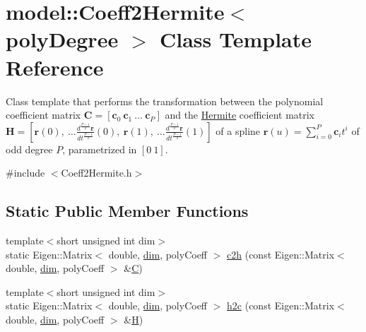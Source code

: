 \hypertarget{classmodel_1_1_coeff2_hermite}{}\section{model\+:\+:Coeff2\+Hermite$<$ poly\+Degree $>$ Class Template Reference}
\label{classmodel_1_1_coeff2_hermite}


Class template that performs the transformation between the polynomial coefficient matrix $ \mathbf{C}=\left[\mathbf{c}_0\ \mathbf{c}_1\ \ldots \ \mathbf{c}_P\right]$ and the \hyperlink{classmodel_1_1_hermite}{Hermite} coefficient matrix $ \mathbf{H}=\left[\mathbf{r}(0),\ \ldots \frac{d^\frac{P-1}{2}\mathbf{r}}{dt^\frac{P-1}{2}}(0),\ \mathbf{r}(1),\ \ldots \frac{d^\frac{P-1}{2}\mathbf{r}}{dt^\frac{P-1}{2}}(1)\right]$ of a spline $\mathbf{r}(u)=\sum_{i=0}^P\mathbf{c}_it^i$ of odd degree $P$, parametrized in $[0\ 1]$.  




{\ttfamily \#include $<$Coeff2\+Hermite.\+h$>$}

\subsection*{Static Public Member Functions}
\begin{DoxyCompactItemize}
\item 
{\footnotesize template$<$short unsigned int dim$>$ }\\static Eigen\+::\+Matrix$<$ double, \hyperlink{plot_nd_a_8m_a382f3ca768b275b8d563604f7fc7df73}{dim}, poly\+Coeff $>$ \hyperlink{classmodel_1_1_coeff2_hermite_ae1c3a31268adf6f214148f99af7c2c45}{c2h} (const Eigen\+::\+Matrix$<$ double, \hyperlink{plot_nd_a_8m_a382f3ca768b275b8d563604f7fc7df73}{dim}, poly\+Coeff $>$ \&\hyperlink{plot_cells_8m_aaa53ca0b650dfd85c4f59fa156f7a2cc}{C})
\item 
{\footnotesize template$<$short unsigned int dim$>$ }\\static Eigen\+::\+Matrix$<$ double, \hyperlink{plot_nd_a_8m_a382f3ca768b275b8d563604f7fc7df73}{dim}, poly\+Coeff $>$ \hyperlink{classmodel_1_1_coeff2_hermite_a0a1bb9b52c5c16b7b7d7cf0beeab7fc2}{h2c} (const Eigen\+::\+Matrix$<$ double, \hyperlink{plot_nd_a_8m_a382f3ca768b275b8d563604f7fc7df73}{dim}, poly\+Coeff $>$ \&\hyperlink{tube_plotter_8m_a308cc9455b6611a0d29c79fcff9aa774}{H})
\end{DoxyCompactItemize}
